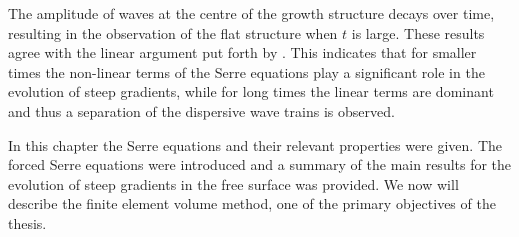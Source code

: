 The amplitude of waves at the centre of the growth structure decays over time, resulting in the observation of the flat structure when $t$ is large. These results agree with the linear argument put forth by \citet{Dougalis-etal-2007}. This indicates that for smaller times the non-linear terms of the Serre equations play a significant role in the evolution of steep gradients, while for long times the linear terms are dominant and thus a separation of the dispersive wave trains is observed. 

\medskip

In this chapter the Serre equations and their relevant properties were given. The forced Serre equations were introduced and a summary of the main results for the evolution of steep gradients in the free surface was provided. We now will describe the finite element volume method, one of the primary objectives of the thesis. 
